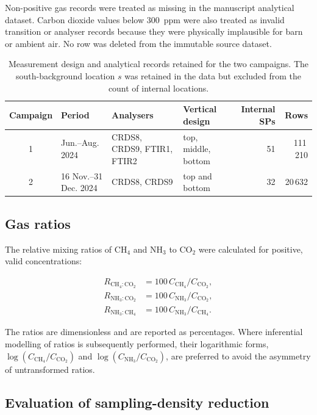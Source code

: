 \documentclass[12pt,a4paper]{article}
\begin{document}
Non-positive gas records were treated as missing in the manuscript analytical
dataset. Carbon dioxide values below \SI{300}{ppm} were also treated as
invalid transition or analyser records because they were physically
implausible for barn or ambient air. No row was deleted from the immutable
source dataset.

\begin{table}[htbp]
\centering
\caption{Measurement design and analytical records retained for the two
campaigns. The south-background location \(s\) was retained in the data but
excluded from the count of internal locations.}
\label{tab:campaigns}
\begingroup
\small
\setlength{\tabcolsep}{1.5pt}
\begin{tabular}{@{}c l
  >{\raggedright\arraybackslash}p{4.0cm}
  >{\raggedright\arraybackslash}p{2.7cm}
  r r@{}}
\toprule
Campaign & Period & Analysers & Vertical design & Internal SPs & Rows\\
\midrule
1 & Jun.--Aug. 2024 & CRDS8, CRDS9, FTIR1, FTIR2 &
top, middle, bottom & 51 & 111\,210\\
2 & 16 Nov.--31 Dec. 2024 & CRDS8, CRDS9 &
top and bottom & 32 & 20\,632\\
\bottomrule
\end{tabular}
\endgroup
\end{table}

\subsection{Gas ratios}

The relative mixing ratios of \(\mathrm{CH_4}\) and \(\mathrm{NH_3}\) to
\(\mathrm{CO_2}\) were calculated for positive, valid concentrations:

\begin{align}
R_{\mathrm{CH_4:CO_2}} &=
100\,C_{\mathrm{CH_4}}/C_{\mathrm{CO_2}},\\
R_{\mathrm{NH_3:CO_2}} &=
100\,C_{\mathrm{NH_3}}/C_{\mathrm{CO_2}},\\
R_{\mathrm{NH_3:CH_4}} &=
100\,C_{\mathrm{NH_3}}/C_{\mathrm{CH_4}}.
\end{align}

The ratios are dimensionless and are reported as percentages. Where
inferential modelling of ratios is subsequently performed, their logarithmic
forms, \(\log(C_{\mathrm{CH_4}}/C_{\mathrm{CO_2}})\) and
\(\log(C_{\mathrm{NH_3}}/C_{\mathrm{CO_2}})\), are preferred to avoid the
asymmetry of untransformed ratios.

\subsection{Evaluation of sampling-density reduction}
\end{document}
